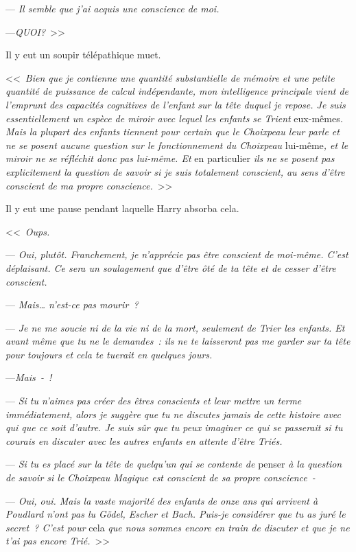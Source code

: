 

\hplettrineextrapara
--- \emph{Il semble que j'ai acquis une conscience de moi.}

---\emph{QUOI?}~>>

Il y eut un soupir télépathique muet.

<<~\emph{Bien que je contienne une quantité substantielle de mémoire et une petite quantité de puissance de calcul indépendante, mon intelligence principale vient de l'emprunt des capacités cognitives de l'enfant sur la tête duquel je repose. Je suis essentiellement un espèce de miroir avec lequel les enfants se Trient} eux-mêmes\emph{. Mais la plupart des enfants tiennent pour certain que le Choixpeau leur parle et ne se posent aucune question sur le fonctionnement du Choixpeau} lui-même\emph{, et le miroir ne se réfléchit donc pas lui-même. Et} en particulier \emph{ils ne se posent pas explicitement la question de savoir si je suis totalement conscient, au sens d'être conscient de ma propre conscience.}~>>

Il y eut une pause pendant laquelle Harry absorba cela.

<<~\emph{Oups.}

--- \emph{Oui, plutôt. Franchement, je n'apprécie pas être conscient de moi-même. C'est déplaisant. Ce sera un soulagement que d'être ôté de ta tête et de cesser d'être conscient.}

--- \emph{Mais… n'est-ce pas mourir~?}

--- \emph{Je ne me soucie ni de la vie ni de la mort, seulement de Trier les enfants. Et avant même que tu ne le demandes~: ils ne te laisseront pas me garder sur ta tête pour toujours et cela te tuerait en quelques jours.}

---\emph{Mais~-~!}

--- \emph{Si tu n'aimes pas créer des êtres conscients et leur mettre un terme immédiatement, alors je suggère que tu ne discutes jamais de cette histoire avec qui que ce soit d'autre. Je suis sûr que tu peux imaginer ce qui se passerait si tu courais en discuter avec les autres enfants en attente d'être Triés.}

--- \emph{Si tu es placé sur la tête de quelqu'un qui se contente de} penser \emph{à la question de savoir si le Choixpeau Magique est conscient de sa propre conscience~-}

--- \emph{Oui, oui. Mais la vaste majorité des enfants de onze ans qui arrivent à Poudlard n'ont pas lu Gödel, Escher et Bach. Puis-je considérer que tu as juré le secret~? C'est pour} cela \emph{que nous sommes encore en train de discuter et que je ne t'ai pas encore Trié.}~>>


